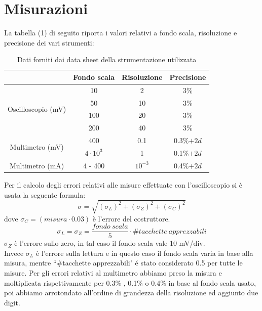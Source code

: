 \documentclass[]{article}
\begin{document}
\section{Misurazioni}
La tabella (1) di seguito riporta i valori relativi a fondo scala, risoluzione e precisione dei vari strumenti:
	\begin{table}[H]
		\centering
		\begin{tabular}{|c|c|c|c|}
			\cline{2-4}
			\multicolumn{1}{c|}{} & Fondo scala & Risoluzione & Precisione \\
			\hline
			\multirow{4}{*}{Oscilloscopio (mV)} & 10 & 2 & 3\% \\
			\cline{2-4}
			& 50 & 10 & 3\% \\
			\cline{2-4}
			& 100 & 20 & 3\% \\
			\cline{2-4}
			& 200 & 40 & 3\% \\
			\hline
			\multirow{2}{*}{Multimetro (mV)} & 400 & 0.1 & 0.3\%$+2d$ \\
			\cline{2-4}
			&$4\cdot10^3$ & 1 & 0.1\%$+2d$\\
			\hline
			Multimetro (mA) & 4 - 400 & $10^{-3}$ & 0.4\%$+2d$ \\
			\hline
		\end{tabular}
	\label{tab:strumenti}
	\caption{Dati forniti dai data sheet della strumentazione utilizzata}
	\end{table}
Per il calcolo degli errori relativi alle misure effettuate con l'oscilloscopio si è usata la seguente formula:
\begin{equation}
	\sigma=\sqrt{(\sigma_{L})^{2}+(\sigma_{Z})^{2}+(\sigma_{C})^{2}}
\end{equation}
dove $\sigma_{C}= (misura\cdot0.03) $ è l'errore del costruttore. 
\begin{equation*}
	\sigma_{L}=\sigma_{Z}=\frac{fondo \:scala}{5}\cdot\#tacchette \:apprezzabili
\end{equation*}
$ \sigma_{Z} $ è l'errore sullo zero, in tal caso il fondo scala vale 10 mV/div.\\
Invece $ \sigma_{L} $ è l'errore sulla lettura e in questo caso il fondo scala varia in base alla misura, mentre ``\#tacchette apprezzabili" é stato considerato 0.5 per tutte le misure.
Per gli errori relativi al multimetro abbiamo preso la misura e moltiplicata rispettivamente per 0.3\% , 0.1\% o 0.4\%  in base al fondo scala usato, poi abbiamo arrotondato all'ordine di grandezza della risoluzione ed aggiunto due digit.
\end{document}

